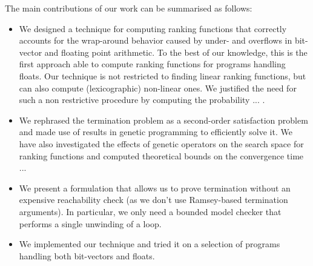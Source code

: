 \documentclass[preprint]{sigplanconf}
\theoremstyle{definition}
\begin{document}
 The main contributions of our work can be summarised as follows:
\begin{itemize}
\item We designed a technique for computing ranking functions that correctly accounts for the wrap-around behavior caused by under- and overflows in bit-vector and floating point arithmetic. To the best of our knowledge, this is the first approach able to compute ranking functions for programs handling floats. Our technique is not restricted to finding linear ranking functions, but can also compute (lexicographic) non-linear  ones. We justified the need for such a non restrictive procedure by computing the probability ... .
\item  We rephrased the termination problem as a second-order satisfaction problem and made 
use of results in genetic programming to efficiently solve it. We have also investigated the effects of genetic operators on the search space for ranking functions and computed theoretical 
bounds on the convergence time ...
\item We present a formulation that allows us to prove termination without an expensive reachability check (as we don't use Ramsey-based termination arguments).  In particular,
we only need a bounded model checker that performs a single unwinding of a loop.
\item We implemented our technique and tried it on a selection of programs handling both bit-vectors and floats.
\end{itemize}





\end{document}
